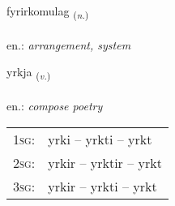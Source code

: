 \documentclass[frontgrid, backgrid]{flacards}\usepackage[]{graphicx}\usepackage[]{xcolor}
\begin{document}
\renewcommand{\flhead}{\vskip5pt \fboxsep=0pt {\small\bfseries\footnotesize Nafnorð | Noun}}
\renewcommand{\fcfoot}{\vskip5pt \fboxsep=0pt \hspace{2pt}{\small\bfseries\footnotesize 2K}}

\renewcommand{\blhead}{\vskip5pt {\small\bfseries\footnotesize Nafnorð | Noun }}
\renewcommand{\bcfoot}{\vskip5pt \hspace{2pt}{\small\bfseries\footnotesize 2K}}


{fyrirkomulag \small{\textsubscript{(\textit{n.})}} \\[1ex] %
 \\
en.: \emph{arrangement, system} \\  [2ex]
\renewcommand*{\arraystretch}{0.8}
}

\renewcommand{\flhead}{\vskip5pt \fboxsep=0pt {\small\bfseries\footnotesize Sagnorð | Verb}}
\renewcommand{\fcfoot}{\vskip5pt \fboxsep=0pt \hspace{2pt}{\small\bfseries\footnotesize 2K}}

\renewcommand{\blhead}{\vskip5pt {\small\bfseries\footnotesize Sagnorð | Verb }}
\renewcommand{\bcfoot}{\vskip5pt \hspace{2pt}{\small\bfseries\footnotesize 2K}}


{yrkja \small{\textsubscript{(\textit{v.})}} \\[1ex] %
\textphonetic{[ɪr̥ca]} \\
en.: \emph{compose poetry} \\  [2ex]
\renewcommand*{\arraystretch}{0.8}
\begin{tabular}{p{1cm}l}
\textsc{1sg}: & yrki -- yrkti -- yrkt \\ 
\textsc{2sg}: & yrkir -- yrktir -- yrkt \\ 
\textsc{3sg}: & yrkir -- yrkti -- yrkt \\ 
\end{tabular}
}
\end{document}
